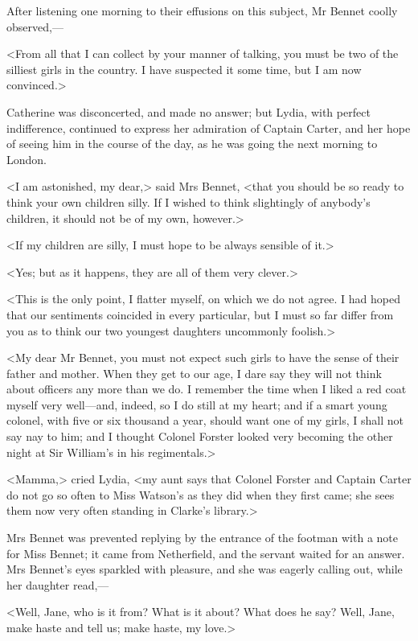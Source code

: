 After listening one morning to their effusions on this subject, Mr Bennet coolly observed,—

<From all that I can collect by your manner of talking, you must be two of the silliest girls in the country. I have suspected it some time, but I am now convinced.>

Catherine was disconcerted, and made no answer; but Lydia, with perfect indifference, continued to express her admiration of Captain Carter, and her hope of seeing him in the course of the day, as he was going the next morning to London.

<I am astonished, my dear,> said Mrs Bennet, <that you should be so ready to think your own children silly. If I wished to think slightingly of anybody's children, it should not be of my own, however.>

<If my children are silly, I must hope to be always sensible of it.>

<Yes; but as it happens, they are all of them very clever.>

<This is the only point, I flatter myself, on which we do not agree. I had hoped that our sentiments coincided in every particular, but I must so far differ from you as to think our two youngest daughters uncommonly foolish.>

<My dear Mr Bennet, you must not expect such girls to have the sense of their father and mother. When they get to our age, I dare say they will not think about officers any more than we do. I remember the time when I liked a red coat myself very well—and, indeed, so I do still at my heart; and if a smart young colonel, with five or six thousand a year, should want one of my girls, I shall not say nay to him; and I thought Colonel Forster looked very becoming the other night at Sir William's in his regimentals.>

<Mamma,> cried Lydia, <my aunt says that Colonel Forster and Captain Carter do not go so often to Miss Watson's as they did when they first came; she sees them now very often standing in Clarke's library.>

Mrs Bennet was prevented replying by the entrance of the footman with a note for Miss Bennet; it came from Netherfield, and the servant waited for an answer. Mrs Bennet's eyes sparkled with pleasure, and she was eagerly calling out, while her daughter read,—

<Well, Jane, who is it from? What is it about? What does he say? Well, Jane, make haste and tell us; make haste, my love.>

